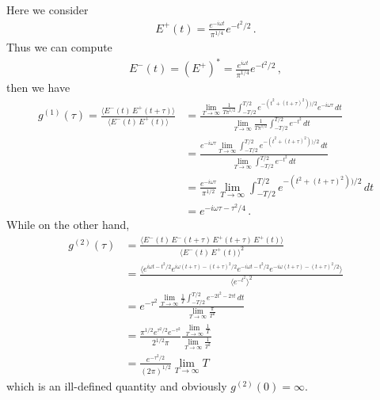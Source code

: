 \documentclass[11pt, oneside]{book}
\theoremstyle{break}
\theoremstyle{break}
\begin{document}
\newpage
Here we consider
\begin{align*}
E^+(t) = \frac{e^{-i\omega t}}{\pi^{1/4}}e^{-t^2/2}\,.
\end{align*}
Thus we can compute
\begin{align*}
E^-(t) = (E^+)^* = \frac{e^{i\omega t}}{\pi^{1/4}}e^{-t^2/2}\,,
\end{align*}
then we have
\begin{align*}
g^{(1)}(\tau) = \frac{\langle E^-(t)\, E^+(t+\tau)\rangle}{\langle E^-(t)\, E^+(t)\rangle} 
&= 
\frac{\lim_{T\to \infty}\frac{1}{T \pi^{1/2}}\int^{T/2}_{-T/2} e^{-(t^2+(t+\tau)^2))/2}e^{-i\omega\tau}\, dt}{\lim_{T\to \infty}\frac{1}{T\pi^{1/2}}\int^{T/2}_{-T/2}e^{-t^2}\,dt}\\
&=\frac{e^{-i\omega\tau}\lim_{T\to \infty}\int^{T/2}_{-T/2} e^{-(t^2+(t+\tau)^2))/2}\, dt}{\lim_{T\to \infty}\int^{T/2}_{-T/2}e^{-t^2}\,dt}\\
&=\frac{e^{-i\omega\tau}}{\pi^{1/2}} \lim_{T\to \infty}\int^{T/2}_{-T/2} e^{-(t^2+(t+\tau)^2))/2}\, dt\\
&= e^{-i\omega \tau - \tau^2/4}\,.
\end{align*}
While on the other hand,
\begin{align*}
g^{(2)}(\tau) &= \frac{\langle E^-(t)\,E^-(t+\tau) \,E^+(t+\tau)\, E^+(t)\rangle}{\langle E^-(t) \, E^+(t)\rangle^2}\\
&= \frac{\langle
e^{i\omega t-t^2/2}
e^{i\omega(t+\tau)-(t+\tau)^2/2}
e^{-i\omega t-t^2/2}
e^{-i\omega(t+\tau)-(t+\tau)^2/2}
 \rangle}{\langle
e^{-t^2}
\rangle^2}\\
&= e^{-\tau^2}\frac{\lim_{T\to \infty}\frac{1}{T} \int_{-T/2}^{T/2} 
e^{-2t^2-2\tau t}\, dt
}{\lim_{T\to \infty}\frac{\pi}{T^2}
}\\
&= \frac{\pi^{1/2}e^{\tau^2/2}e^{-\tau^2}}{ 2^{1/2} \pi}\frac{\lim_{T\to \infty}\frac{1}{T} 
}{\lim_{T\to \infty}\frac{1}{T^2}
}\\
&= \frac{e^{-\tau^2/2}}{ (2\pi)^{1/2}}\lim_{T\to \infty} T
\end{align*}
which is an ill-defined quantity and obviously $g^{(2)}(0) = \infty$. 
\end{document}
